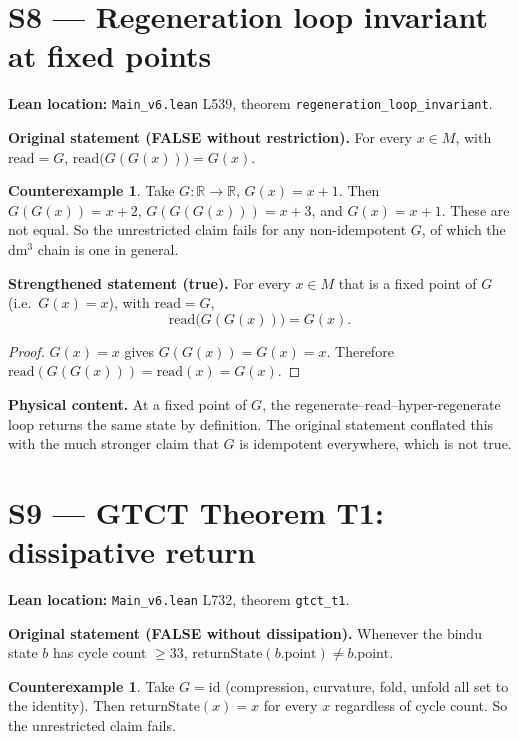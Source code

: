\documentclass[11pt,a4paper]{article}
\newcommand{\R}{\mathbb{R}}
\theoremstyle{plain}
\theoremstyle{definition}
\newtheorem{counterexample}[theorem]{Counterexample}
\begin{document}
\section{S8 --- Regeneration loop invariant at fixed points}
\label{sec:S8}

\textbf{Lean location:} \texttt{Main\_v6.lean} L539, theorem
\texttt{regeneration\_loop\_invariant}.

\textbf{Original statement (FALSE without restriction).}
For every $x \in M$, with $\mathrm{read} = G$,
$\mathrm{read}\bigl(G(G(x))\bigr) = G(x)$.

\begin{counterexample}
Take $G : \R \to \R$, $G(x) = x + 1$.  Then $G(G(x)) = x+2$, $G(G(G(x))) = x+3$,
and $G(x) = x+1$.  These are not equal.  So the unrestricted claim fails for any
non-idempotent $G$, of which the dm$^{3}$ chain is one in general.
\end{counterexample}

\textbf{Strengthened statement (true).}
For every $x \in M$ that is a fixed point of $G$ (i.e.\ $G(x) = x$), with
$\mathrm{read} = G$,
\[
  \mathrm{read}\bigl(G(G(x))\bigr) = G(x).
\]

\begin{proof}
$G(x) = x$ gives $G(G(x)) = G(x) = x$.  Therefore
$\mathrm{read}(G(G(x))) = \mathrm{read}(x) = G(x)$.
\end{proof}

\textbf{Physical content.}
At a fixed point of $G$, the regenerate--read--hyper-regenerate loop
returns the same state by definition.  The original statement conflated this
with the much stronger claim that $G$ is idempotent everywhere, which is not
true.

\section{S9 --- GTCT Theorem T1: dissipative return}
\label{sec:S9}

\textbf{Lean location:} \texttt{Main\_v6.lean} L732, theorem
\texttt{gtct\_t1}.

\textbf{Original statement (FALSE without dissipation).}
Whenever the bindu state $b$ has cycle count $\ge 33$,
$\mathrm{returnState}(b.\mathrm{point}) \ne b.\mathrm{point}$.

\begin{counterexample}
Take $G = \mathrm{id}$ (compression, curvature, fold, unfold all set to the
identity).  Then $\mathrm{returnState}(x) = x$ for every $x$ regardless of cycle
count.  So the unrestricted claim fails.
\end{counterexample}
\end{document}

